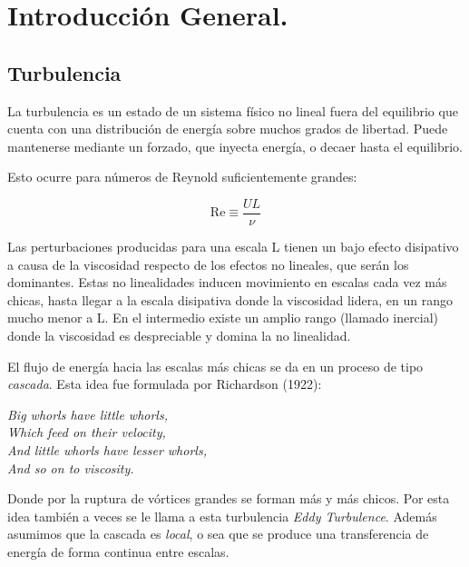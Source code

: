 

\section{Introducción General.}
\subsection*{Turbulencia}
La turbulencia es un estado de un sistema físico no lineal fuera del equilibrio que cuenta con una distribución de energía sobre muchos grados de libertad. Puede mantenerse mediante un forzado, que inyecta energía, o decaer hasta el equilibrio. \cite{falkovichTurbulence2006}

Esto ocurre para números de Reynold suficientemente grandes:

\begin{equation}
	\text{Re} \equiv \frac{UL}{\nu}
\end{equation}

Las perturbaciones producidas para una escala L tienen un bajo efecto disipativo a causa de la viscosidad respecto de los efectos no lineales, que serán los dominantes. Estas no linealidades inducen movimiento en escalas cada vez más chicas, hasta llegar a la escala disipativa donde la viscosidad lidera, en un rango mucho menor a L. En el intermedio existe un amplio rango (llamado inercial) donde la viscosidad es despreciable y domina la no linealidad. 

El flujo de energía hacia las escalas más chicas se da en un proceso de tipo \textit{cascada}. Esta idea fue formulada por Richardson (1922):

\begin{center}
	\textit{Big whorls have little whorls,} \\
	\textit{Which feed on their velocity,} \\
	\textit{And little whorls have lesser whorls,} \\ 
	\textit{And so on to viscosity.}
\end{center}

Donde por la ruptura de vórtices grandes se forman más y más chicos. Por esta idea también a veces se le llama a esta turbulencia \textit{Eddy Turbulence}. Además asumimos que la cascada es \textit{local}, o sea que se produce una transferencia de energía de forma continua entre escalas.

